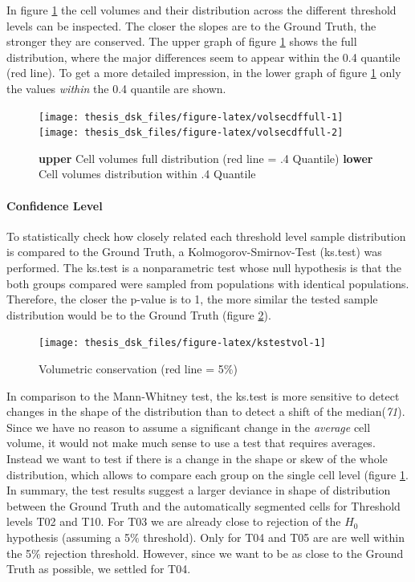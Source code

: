 \documentclass[11pt,singlespacinge,twoside]{reedthesis} %
\theoremstyle{definition}
\theoremstyle{definition}
\theoremstyle{definition}
\theoremstyle{remark}
\begin{document}
In figure \ref{fig:volsecdffull} the cell volumes and their distribution across the different threshold levels can be inspected. The closer the slopes are to the Ground Truth, the stronger they are conserved. The upper graph of figure \ref{fig:volsecdffull} shows the full distribution, where the major differences seem to appear within the 0.4 quantile (red line). To get a more detailed impression, in the lower graph of figure \ref{fig:volsecdffull} only the values \emph{within} the 0.4 quantile are shown.


\begin{figure}

{\centering \texttt{[image: thesis\_dsk\_files/figure-latex/volsecdffull-1]} \texttt{[image: thesis\_dsk\_files/figure-latex/volsecdffull-2]} 

}

\caption[pLLP segmentation: morphological conservation]{\textbf{upper} Cell volumes full distribution (red line = .4 Quantile) \textbf{lower} Cell volumes distribution within .4 Quantile}\label{fig:volsecdffull}
\end{figure}
\hypertarget{confidence-level}{%
\paragraph{Confidence Level}\label{confidence-level}}

To statistically check how closely related each threshold level sample distribution is compared to the Ground Truth, a Kolmogorov-Smirnov-Test (ks.test) was performed. The ks.test is a nonparametric test whose null hypothesis is that the both groups compared were sampled from populations with identical populations. Therefore, the closer the p-value is to 1, the more similar the tested sample distribution would be to the Ground Truth (figure \ref{fig:kstestvol}).


\begin{figure}[H]

{\centering \texttt{[image: thesis\_dsk\_files/figure-latex/kstestvol-1]} 

}

\caption{Volumetric conservation (red line = 5\(\%\))}\label{fig:kstestvol}
\end{figure}
\noindent In comparison to the Mann-Whitney test, the ks.test is more sensitive to detect changes in the shape of the distribution than to detect a shift of the median(\emph{71}). Since we have no reason to assume a significant change in the \emph{average} cell volume, it would not make much sense to use a test that requires averages. Instead we want to test if there is a change in the shape or skew of the whole distribution, which allows to compare each group on the single cell level (figure \ref{fig:volsecdffull}. In summary, the test results suggest a larger deviance in shape of distribution between the Ground Truth and the automatically segmented cells for Threshold levels T02 and T10. For T03 we are already close to rejection of the \(H_0\) hypothesis (assuming a 5\(\%\) threshold). Only for T04 and T05 are are well within the 5\(\%\) rejection threshold. However, since we want to be as close to the Ground Truth as possible, we settled for T04.
\end{document}
